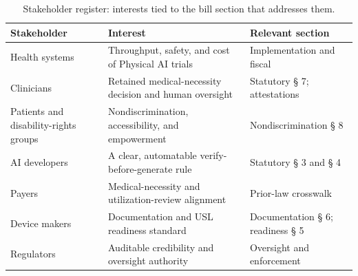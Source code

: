 \begin{table}[ht]
\centering
\begin{tabularx}{\textwidth}{L{4cm} Y L{4.5cm}}
\toprule
\textbf{Stakeholder} & \textbf{Interest} & \textbf{Relevant section} \\
\midrule
Health systems & Throughput, safety, and cost of Physical AI trials & Implementation and fiscal \\
Clinicians & Retained medical-necessity decision and human oversight & Statutory § 7; attestations \\
Patients and disability-rights groups & Nondiscrimination, accessibility, and empowerment \cite{usc-ada, usc-titlevi} & Nondiscrimination § 8 \\
AI developers & A clear, automatable verify-before-generate rule & Statutory § 3 and § 4 \\
Payers & Medical-necessity and utilization-review alignment & Prior-law crosswalk \\
Device makers & Documentation and USL readiness standard & Documentation § 6; readiness § 5 \\
Regulators & Auditable credibility and oversight authority & Oversight and enforcement \\
\bottomrule
\end{tabularx}
\caption{Stakeholder register: interests tied to the bill section that addresses them.}
\label{tab:stakeholders}
\end{table}


